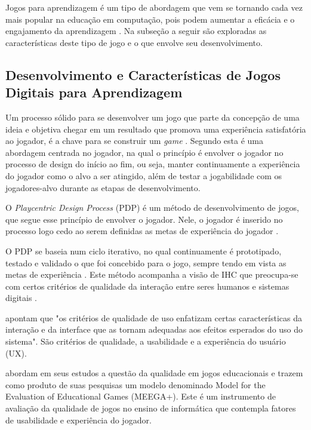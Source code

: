 Jogos para aprendizagem é um tipo de abordagem que vem se tornando cada vez mais popular na educação em computação, pois podem aumentar a eficácia e o engajamento da aprendizagem \cite{battistella, brito, sales_climaco2016, queiroz}. Na subseção a seguir são exploradas as características deste tipo de jogo e o que envolve seu desenvolvimento.

\subsection{Desenvolvimento e Características de Jogos Digitais para Aprendizagem}

Um processo sólido para se desenvolver um jogo que parte da concepção de uma ideia e objetiva chegar em um resultado que promova uma experiência satisfatória ao jogador, é a chave para se construir um \textit{game} \cite[p. 10-11]{Fullerton_2008}.  Segundo  esta é uma abordagem centrada no jogador, na qual o princípio é envolver o jogador no processo de design do início ao fim, ou seja, manter continuamente a experiência do jogador como o alvo a ser atingido, além de testar a jogabilidade com os jogadores-alvo durante as etapas de desenvolvimento.

O \textit{Playcentric Design Process} (PDP) é um método de desenvolvimento de jogos, que segue esse princípio de envolver o jogador. Nele, o jogador é inserido no processo logo cedo ao serem definidas as metas de experiência do jogador \cite{Fullerton_2008}.

O PDP se baseia num ciclo iterativo, no qual continuamente é prototipado, testado e validado o que foi concebido para o jogo, sempre tendo em vista as metas de experiência \cite[p. 10-11]{Fullerton_2008}. Este método acompanha a visão de IHC que preocupa-se com certos critérios de qualidade da interação entre seres humanos e sistemas digitais \cite[p. 8-10]{BarbosaEtAl2021}.

 apontam que "os critérios de qualidade de uso enfatizam certas características da interação e da interface que as tornam adequadas aos efeitos esperados do uso do sistema". São critérios de qualidade, a usabilidade e a experiência do usuário (UX).

 abordam em seus estudos a questão da qualidade em jogos educacionais e trazem como produto de suas pesquisas um modelo denominado Model for the Evaluation of Educational Games (MEEGA+). Este é um instrumento de avaliação da qualidade de jogos no ensino de informática que contempla fatores de usabilidade e experiência do jogador.

